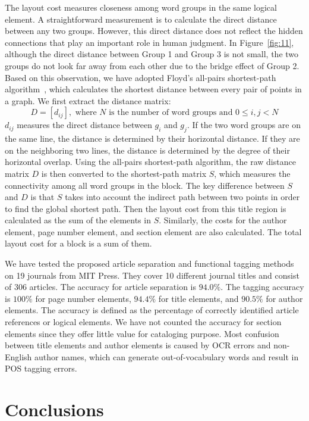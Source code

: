 \documentclass[10pt]{article}
\begin{document}
The layout cost measures closeness among word groups in the same logical element. A straightforward measurement is to calculate the direct distance between any two groups. However, this direct distance does not reflect the hidden connections that play an important role in human judgment. In Figure~\ref{fig:11}, although the direct distance between Group 1 and Group 3 is not small, the two groups do not look far away from each other due to the bridge effect of Group 2. Based on this observation, we have adopted Floyd's all-pairs shortest-path algorithm~\cite{Allison1991}, which calculates the shortest distance between every pair of points in a graph. We first extract the distance matrix:
\[
D = [d_{ij}], \text{ where } N \text{ is the number of word groups and } 0 \leq i,j < N \tag{7}
\]
\(d_{ij}\) measures the direct distance between \(g_i\) and \(g_j\). If the two word groups are on the same line, the distance is determined by their horizontal distance. If they are on the neighboring two lines, the distance is determined by the degree of their horizontal overlap. Using the all-pairs shortest-path algorithm, the raw distance matrix \(D\) is then converted to the shortest-path matrix \(S\), which measures the connectivity among all word groups in the block. The key difference between \(S\) and \(D\) is that \(S\) takes into account the indirect path between two points in order to find the global shortest path. Then the layout cost from this title region is calculated as the sum of the elements in \(S\). Similarly, the costs for the author element, page number element, and section element are also calculated. The total layout cost for a block is a sum of them.

We have tested the proposed article separation and functional tagging methods on 19 journals from MIT Press. They cover 10 different journal titles and consist of 306 articles. The accuracy for article separation is \(94.0\%\). The tagging accuracy is \(100\%\) for page number elements, \(94.4\%\) for title elements, and \(90.5\%\) for author elements. The accuracy is defined as the percentage of correctly identified article references or logical elements. We have not counted the accuracy for section elements since they offer little value for cataloging purpose. Most confusion between title elements and author elements is caused by OCR errors and non-English author names, which can generate out-of-vocabulary words and result in POS tagging errors.

\section{Conclusions}
\label{sec:conclusion}
\end{document}
